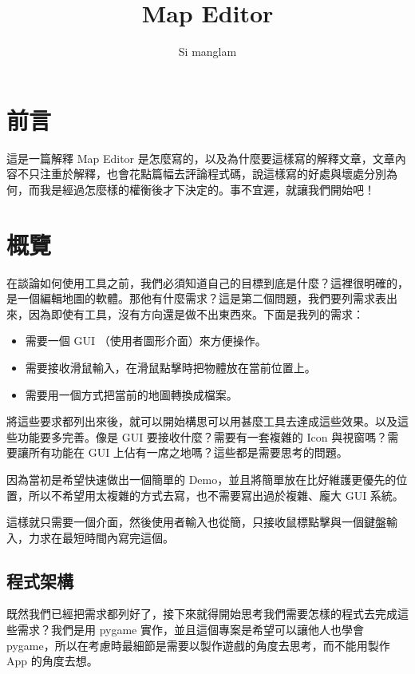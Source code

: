 \documentclass[12pt, a4paper]{siweb}
\title{Map Editor}
\author{Si manglam}
\begin{document}
\maketitle
\tableofcontents
\newpage
{}
\linespread{1.35}
\section{前言}

這是一篇解釋 Map Editor 是怎麼寫的，以及為什麼要這樣寫的解釋文章，文章內容不只注重於解釋，也會花點篇幅去評論程式碼，說這樣寫的好處與壞處分別為何，而我是經過怎麼樣的權衡後才下決定的。事不宜遲，就讓我們開始吧！

\section{概覽}

在談論如何使用工具之前，我們必須知道自己的目標到底是什麼？這裡很明確的，是一個編輯地圖的軟體。那他有什麼需求？這是第二個問題，我們要列需求表出來，因為即使有工具，沒有方向還是做不出東西來。下面是我列的需求：

\begin{itemize}
\item 需要一個 GUI （使用者圖形介面）來方便操作。
\item 需要接收滑鼠輸入，在滑鼠點擊時把物體放在當前位置上。
\item 需要用一個方式把當前的地圖轉換成檔案。
\end{itemize}

將這些要求都列出來後，就可以開始構思可以用甚麼工具去達成這些效果。以及這些功能要多完善。像是 GUI 要接收什麼？需要有一套複雜的 Icon 與視窗嗎？需要讓所有功能在 GUI 上佔有一席之地嗎？這些都是需要思考的問題。

因為當初是希望快速做出一個簡單的 Demo，並且將簡單放在比好維護更優先的位置，所以不希望用太複雜的方式去寫，也不需要寫出過於複雜、龐大 GUI 系統。

這樣就只需要一個介面，然後使用者輸入也從簡，只接收鼠標點擊與一個鍵盤輸入，力求在最短時間內寫完這個。

\subsection{程式架構}

既然我們已經把需求都列好了，接下來就得開始思考我們需要怎樣的程式去完成這些需求？我們是用 pygame 實作，並且這個專案是希望可以讓他人也學會 pygame，所以在考慮時最細節是需要以製作遊戲的角度去思考，而不能用製作 App 的角度去想。
\end{document}
